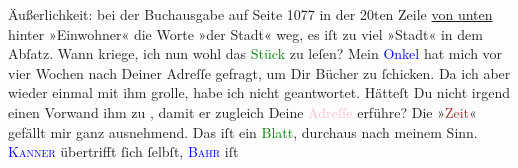                Äußerlichkeit: bei der Buchausgabe \label{K_mets_Goldmann_94-partII-5v}\label{K_mets_Goldmann_94-partII-5h} auf
               Seite 1077 in der 20ten Zeile \uline{von unten} hinter
               »Einwohner« die Worte »der Stadt« weg, es iſt zu viel »Stadt« in dem Abſatz.\pend
           \pstart
           Wann kriege, ich nun wohl das \textcolor{green}{Stück}{} zu leſen?\pend
           \pstart
           Mein \strikeout{\textcolor{gray}{Onk}}{ }\textcolor{blue}{Onkel}{} hat mich
               vor vier Wochen nach Deiner Adreſſe gefragt, um Dir Bücher zu ſchicken. Da ich aber
               wieder einmal mit ihm grolle, habe ich nicht geantwortet. Hätteſt Du nicht irgend
               einen Vorwand ihm zu \label{K_mets_Goldmann_94-partII-44v}\label{K_mets_Goldmann_94-partII-44h}{ }, damit er zugleich {\pb}Deine \textcolor{pink}{Adreſſe}{} erführe?\pend
           \pstart
           Die »\textcolor{brown}{Zeit}{}\ledrightnote{\textcolor{brown}{Die Zeit. Wiener Wochenschrift}}« gefällt mir ganz ausnehmend. Das iſt ein
                  \textcolor{green}{Blatt}{}, durchaus nach meinem
               Sinn. \textsc{\textcolor{blue}{Kanner}{}\ledrightnote{\textcolor{blue}{Heinrich Kanner}}} übertrifft
               ſich ſelbſt, \textsc{\textcolor{blue}{Bahr}{}\ledrightnote{\textcolor{blue}{Hermann Bahr}}} iſt
